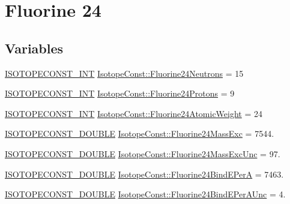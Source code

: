 \hypertarget{group___isotope_const-_fluorine-_f24}{}\section{Fluorine 24}
\label{group___isotope_const-_fluorine-_f24}
\subsection*{Variables}
\begin{DoxyCompactItemize}
\item 
\mbox{\hyperlink{group___isotope_const-_macros_ga5f18360b3e99483a35c32d789e62621c}{I\+S\+O\+T\+O\+P\+E\+C\+O\+N\+S\+T\+\_\+\+I\+NT}} \mbox{\hyperlink{group___isotope_const-_fluorine-_f24_ga51a833e502384973f697e9df920ac2ed}{Isotope\+Const\+::\+Fluorine24\+Neutrons}} = 15
\item 
\mbox{\hyperlink{group___isotope_const-_macros_ga5f18360b3e99483a35c32d789e62621c}{I\+S\+O\+T\+O\+P\+E\+C\+O\+N\+S\+T\+\_\+\+I\+NT}} \mbox{\hyperlink{group___isotope_const-_fluorine-_f24_gac5e7212be261da3a6899fdb7e0c0300c}{Isotope\+Const\+::\+Fluorine24\+Protons}} = 9
\item 
\mbox{\hyperlink{group___isotope_const-_macros_ga5f18360b3e99483a35c32d789e62621c}{I\+S\+O\+T\+O\+P\+E\+C\+O\+N\+S\+T\+\_\+\+I\+NT}} \mbox{\hyperlink{group___isotope_const-_fluorine-_f24_gabb83b3c48365e84c41af903704f29370}{Isotope\+Const\+::\+Fluorine24\+Atomic\+Weight}} = 24
\item 
\mbox{\hyperlink{group___isotope_const-_macros_ga8f45a7272ce02c0b4c65c44636ed719a}{I\+S\+O\+T\+O\+P\+E\+C\+O\+N\+S\+T\+\_\+\+D\+O\+U\+B\+LE}} \mbox{\hyperlink{group___isotope_const-_fluorine-_f24_gabb93d014f843b66f311441b938078d8e}{Isotope\+Const\+::\+Fluorine24\+Mass\+Exc}} = 7544.
\item 
\mbox{\hyperlink{group___isotope_const-_macros_ga8f45a7272ce02c0b4c65c44636ed719a}{I\+S\+O\+T\+O\+P\+E\+C\+O\+N\+S\+T\+\_\+\+D\+O\+U\+B\+LE}} \mbox{\hyperlink{group___isotope_const-_fluorine-_f24_gac7e027a7fb4e7962d321ddca577022ea}{Isotope\+Const\+::\+Fluorine24\+Mass\+Exc\+Unc}} = 97.
\item 
\mbox{\hyperlink{group___isotope_const-_macros_ga8f45a7272ce02c0b4c65c44636ed719a}{I\+S\+O\+T\+O\+P\+E\+C\+O\+N\+S\+T\+\_\+\+D\+O\+U\+B\+LE}} \mbox{\hyperlink{group___isotope_const-_fluorine-_f24_gaec58a0ed6955392b0e88e5a9b56b6312}{Isotope\+Const\+::\+Fluorine24\+Bind\+E\+PerA}} = 7463.
\item 
\mbox{\hyperlink{group___isotope_const-_macros_ga8f45a7272ce02c0b4c65c44636ed719a}{I\+S\+O\+T\+O\+P\+E\+C\+O\+N\+S\+T\+\_\+\+D\+O\+U\+B\+LE}} \mbox{\hyperlink{group___isotope_const-_fluorine-_f24_ga7454266cd58dfc605e9d4352ab06d650}{Isotope\+Const\+::\+Fluorine24\+Bind\+E\+Per\+A\+Unc}} = 4.

\end{DoxyCompactItemize}

